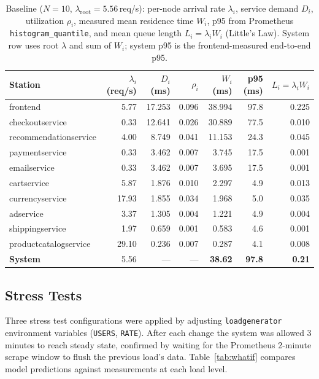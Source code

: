 \documentclass[12pt]{article}
\begin{document}
\begin{table}[H]
  \centering
  \small
  \setlength{\tabcolsep}{5pt}
  \begin{tabular}{l|r|r|r|r|r|r}
    \toprule
    Station & $\lambda_i$ (req/s) & $D_i$ (ms) & $\rho_i$ & $W_i$ (ms) & p95 (ms) & $L_i{=}\lambda_i W_i$ \\
    \midrule
    frontend               &  5.77 & 17.253 & 0.096 & 38.994 &  97.8 & 0.225 \\
    checkoutservice        &  0.33 & 12.641 & 0.026 & 30.889 &  77.5 & 0.010 \\
    recommendationservice  &  4.00 &  8.749 & 0.041 & 11.153 &  24.3 & 0.045 \\
    paymentservice         &  0.33 &  3.462 & 0.007 &  3.745 &  17.5 & 0.001 \\
    emailservice           &  0.33 &  3.462 & 0.007 &  3.695 &  17.5 & 0.001 \\
    cartservice            &  5.87 &  1.876 & 0.010 &  2.297 &   4.9 & 0.013 \\
    currencyservice        & 17.93 &  1.855 & 0.034 &  1.968 &   5.0 & 0.035 \\
    adservice              &  3.37 &  1.305 & 0.004 &  1.221 &   4.9 & 0.004 \\
    shippingservice        &  1.97 &  0.659 & 0.001 &  0.583 &   4.6 & 0.001 \\
    productcatalogservice  & 29.10 &  0.236 & 0.007 &  0.287 &   4.1 & 0.008 \\
    \midrule
    \textbf{System}        &  5.56 &    --- &   --- & \textbf{38.62} & \textbf{97.8} & \textbf{0.21} \\
    \bottomrule
  \end{tabular}
  \caption{Baseline ($N{=}10$, $\lambda_{\text{root}}{=}5.56$\,req/s): per-node arrival rate $\lambda_i$, service demand $D_i$, utilization $\rho_i$, measured mean residence time $W_i$, p95 from Prometheus \texttt{histogram\_quantile}, and mean queue length $L_i = \lambda_i W_i$ (Little's Law). System row uses root $\lambda$ and sum of $W_i$; system p95 is the frontend-measured end-to-end p95.}
  \label{tab:mva-results}
\end{table}

\subsection{Stress Tests}

Three stress test configurations were applied by adjusting \texttt{loadgenerator} environment variables (\texttt{USERS}, \texttt{RATE}). After each change the system was allowed 3 minutes to reach steady state, confirmed by waiting for the Prometheus 2-minute scrape window to flush the previous load's data. Table~\ref{tab:whatif} compares model predictions against measurements at each load level.
\end{document}
